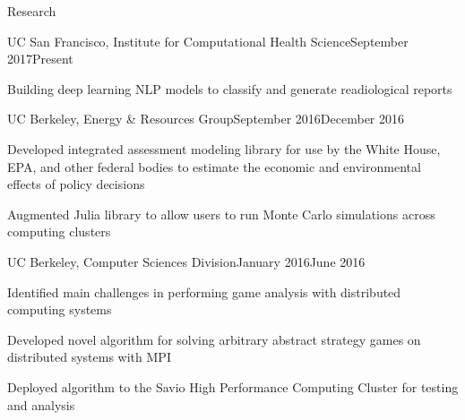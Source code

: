 \documentclass{resume} %
\begin{document}
\begin{rSection}{Research}
\begin{rSubsection}{UC San Francisco,  Institute for Computational Health Science}{September 2017\textminus Present}{}{}
\item[] Building deep learning NLP models to classify and generate readiological reports
\end{rSubsection}
\begin{rSubsection}{UC Berkeley, Energy \& Resources Group}{September 2016\textminus December 2016}{}{}
\item[] Developed integrated assessment modeling library for use by the White House, EPA, and other federal bodies to estimate the economic and environmental effects of policy decisions 
\item[] Augmented Julia library to allow users to run Monte Carlo simulations across computing clusters
\end{rSubsection}
\begin{rSubsection}{UC Berkeley, Computer Sciences Division}{January 2016\textminus June 2016}{}{}
\item[] Identified main challenges in performing game analysis with distributed computing systems
\item[] Developed novel algorithm for solving arbitrary abstract strategy games on distributed systems with MPI
\item[] Deployed algorithm to the Savio High Performance Computing Cluster for testing and analysis
\end{rSubsection}
\end{rSection}






\end{document}
